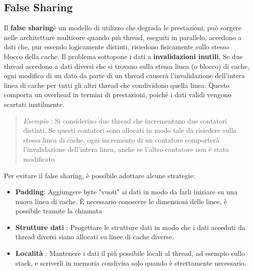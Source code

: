 \documentclass[10pt, letterpaper]{report}
\begin{document}
\subsection{False Sharing}
Il \textbf{false sharing}è un modello di utilizzo che degrada le prestazioni, può sorgere nelle architetture multicore quando più thread, eseguiti in parallelo, accedono a dati che, pur essendo logicamente distinti, risiedono fisicamente sullo stesso blocco della cache.\acc 
Il problema sottopone i dati a \textbf{invalidazioni inutili}, Se due thread accedono a dati diversi che si trovano sulla stessa linea (o blocco) di cache, ogni modifica di un dato da parte di un thread causerà l'invalidazione dell'intera linea di cache per tutti gli altri thread che condividono quella linea. Questo comporta un overhead in termini di prestazioni, poiché i dati validi vengono scartati inutilmente.\begin{quote}
    \textit{Esempio} : Si considerino due thread che incrementano due contatori distinti. Se questi contatori sono allocati in modo tale da risiedere sulla stessa linea di cache, ogni incremento di un contatore comporterà l'invalidazione dell'intera linea, anche se l'altro contatore non è stato modificato
\end{quote}
Per evitare il false sharing, è possibile adottare alcune strategie:
 \begin{itemize}
    \item \textbf{Padding}: Aggiungere byte "vuoti" ai dati in modo da farli iniziare su una nuova linea di cache. È necessario conoscere le dimensioni delle linee, è possibile tramite la chiamata \begin{center}\end{center}
    \item \textbf{Strutture dati} : Progettare le strutture dati in modo che i dati acceduti da thread diversi siano allocati su linee di cache diverse.
    \item \textbf{Località} : Mantenere i dati il più possibile locali al thread, ad esempio sullo stack, e scriverli in memoria condivisa solo quando è strettamente necessario.
\end{itemize}
\end{document}
